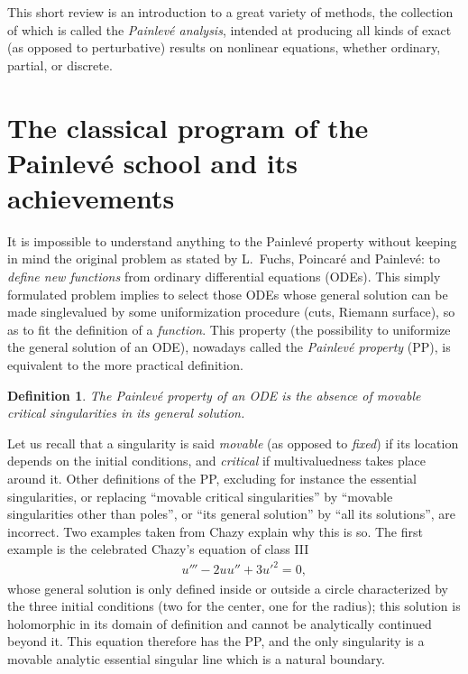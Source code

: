 \documentclass[10pt]{article}
\newtheorem{definition}{Definition}
\begin{document}
\maketitle

\tableofcontents
\vfill \eject

This short review is an introduction to a great variety of methods,
the collection of which is called the
\textit{Painlev\'e analysis},
intended at producing all kinds of exact (as opposed to perturbative)
results on nonlinear equations, whether ordinary, partial, or discrete.

\section{The classical program of the Painlev\'e school and its achievements}
\label{sectionTheclassicalprogram}

It is impossible to understand anything to the Painlev\'e property without
keeping in mind the original problem as stated by L.~Fuchs, Poincar\'e and
Painlev\'e:
to \textit{define new functions} from ordinary differential equations (ODEs).
This simply formulated problem implies to select those ODEs whose
general solution can be made singlevalued
by some uniformization procedure (cuts, Riemann surface),
so as to fit the definition of a \textit{function}.
This property (the possibility to uniformize the general solution of an ODE),
nowadays called the
\textit{Painlev\'e property} (PP),
is equivalent to the more practical definition.

\begin{definition}
The \textit{Painlev\'e property} of an ODE is
the absence of movable critical singularities in its general solution.
\end{definition}

Let us recall that a singularity is said \textit{movable}
(as opposed to \textit{fixed})
if its location depends on the initial conditions,
and \textit{critical} if multivaluedness takes place around it.
Other definitions of the PP,
excluding for instance the essential singularities,
or replacing
``movable critical singularities''
by ``movable singularities other than poles'',
or ``its general solution'' by ``all its solutions'',
are incorrect.
Two examples taken from Chazy \cite{ChazyThese} explain why this is so.
The first example is the celebrated Chazy's equation of class III
\begin{eqnarray}
& &
u''' - 2 u u'' + 3 u'^2=0,
\label{eqChazyIII}
\end{eqnarray}
whose general solution is only defined inside or outside a circle
characterized by the three initial conditions (two for the center, one for the
radius);
this solution is holomorphic in its domain of definition and cannot be
analytically continued beyond it.
This equation therefore has the PP,
and the only singularity is a movable analytic essential singular line
which is a natural boundary.
\end{document}
